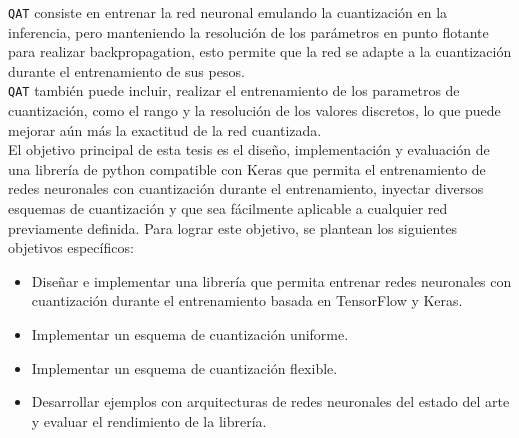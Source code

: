\texttt{QAT} consiste en entrenar la red neuronal emulando la cuantización en la inferencia, pero manteniendo la resolución de los parámetros en punto flotante para realizar backpropagation, esto permite que la red se adapte a la cuantización durante el entrenamiento de sus pesos. \\

\texttt{QAT} también puede incluir, realizar el entrenamiento de los parametros de cuantización, como el rango y la resolución de los valores discretos, lo que puede mejorar aún más la exactitud de la red cuantizada. \\


El objetivo principal de esta tesis es el diseño, implementación y evaluación de una librería de python compatible con Keras que permita el entrenamiento de redes neuronales con cuantización durante el entrenamiento, inyectar diversos esquemas de cuantización y que sea fácilmente aplicable a cualquier red previamente definida. Para lograr este objetivo, se plantean los siguientes objetivos específicos:

\begin{itemize}
    \item Diseñar e implementar una librería que permita entrenar redes neuronales con cuantización durante el entrenamiento basada en TensorFlow y Keras.
    \item Implementar un esquema de cuantización uniforme.
    \item Implementar un esquema de cuantización flexible.
    \item Desarrollar ejemplos con arquitecturas de redes neuronales del estado del arte y evaluar el rendimiento de la librería.
\end{itemize}

